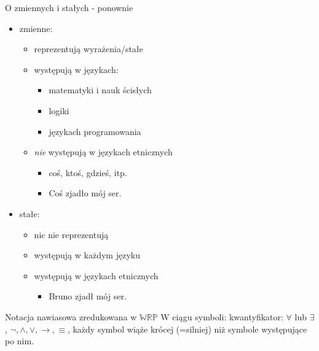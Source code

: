 \documentclass{beamer}
\newcommand {\WRP} {\ensuremath{\mathbb{WRP}}}
\begin{document}
\begin{frame}{O zmiennych i stałych - ponownie}
%
\begin{itemize}
\item zmienne:
\begin{itemize}
\item reprezentują wyrażenia/stałe
\item występują w językach:
\begin{itemize}
\item matematyki i nauk ścisłych
\item logiki
\item językach programowania
\end{itemize}
\item \emph{nie} występują w językach etnicznych
\begin{itemize}
\item coś, ktoś, gdzieś, itp.
\item Coś zjadło mój ser.
\end{itemize}
\end{itemize}
%
\item stałe:
\begin{itemize}
\item nic nie reprezentują
\item występują w każdym języku
\item występują w językach etnicznych
\begin{itemize}
\item Bruno zjadł mój ser.
\end{itemize}
\end{itemize}
\end{itemize}
\end{frame}

\begin{frame}{Notacja nawiasowa zredukowana w \WRP}
W ciągu symboli: kwantyfikator: $\forall$ lub $\exists$, $\neg, \land, \lor, \to, \equiv$, każdy symbol wiąże krócej (=silniej) niż symbole występujące po nim.
\end{frame}
\end{document}
